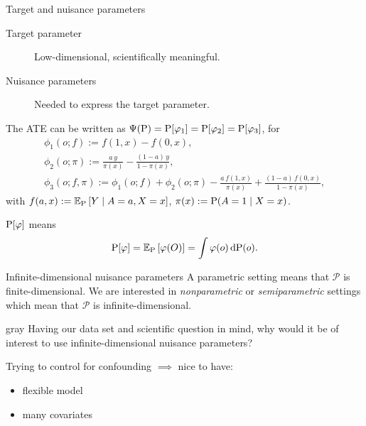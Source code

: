 \documentclass{beamer}\usepackage{listings}
\begin{document}
\begin{frame}[label={sec:org947d11b}]{Target and nuisance parameters}
\pause
\begin{description}
\item[{Target parameter}] Low-dimensional, scientifically meaningful. \pause
\item[{Nuisance parameters}] Needed to express the target parameter. \pause
\end{description}

\begin{example}[ATE]
The ATE can be written as \(\TT(\P) = \P[\phi_1] = \P[\phi_2] = \P[\phi_3]\), for
\begin{equation*}
  \begin{gathered}
    \phi_1(o; f) := f(1,x) - f(0,x), \\
    \phi_2(o; \pi) := \frac{a\,y}{\pi(x)} - \frac{(1-a)\,y}{1-\pi(x)}, \\
    \phi_3(o; f, \pi) := \phi_1(o; f) + \phi_2(o; \pi) - \frac{a\,f(1,x)}{\pi(x)} +
    \frac{(1-a)\,f(0,x)}{1-\pi(x)},
  \end{gathered}
\end{equation*}
with \(f(a, x) := \E_{\P}\left[ Y \mid A=a, X=x  \right]\), \(\pi(x) := \P(A=1 \mid X=x)\).

\vfill
\end{example}

$\P[\phi]$ means
\begin{equation*}
  \P[\phi] = \E_{\P}\left[ \phi(O) \right] = \int \phi(o) \diff \P(o).
\end{equation*}
\end{frame}

\begin{frame}[label={sec:org02b6716}]{Infinite-dimensional nuisance parameters}
A parametric setting means that \(\mathcal{P}\) is finite-dimensional. We are interested in
\emph{nonparametric} or \emph{semiparametric} settings which mean that \(\mathcal{P}\) is
infinite-dimensional.

\vfill \pause

\begin{beamercolorbox}[rounded=true]{gray}
\centering Having our data set and scientific question in mind, why would it be of interest to use
infinite-dimensional nuisance parameters?
\end{beamercolorbox}

\vfill \pause
Trying to control for confounding \(\implies\) nice to have:
\begin{itemize}
\item flexible model
\item many covariates
\end{itemize}
\end{frame}
\end{document}
